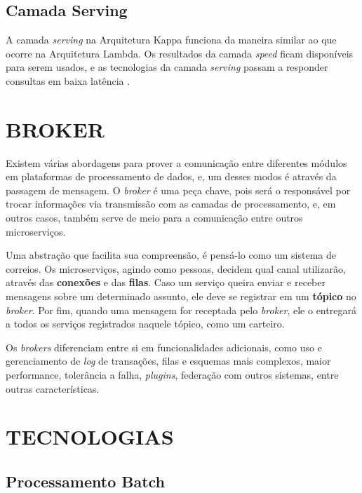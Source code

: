\subsection{Camada Serving}

A camada \textit{serving} na Arquitetura Kappa funciona da maneira similar ao
que ocorre na Arquitetura Lambda. Os resultados da camada \textit{speed}
ficam disponíveis para serem usados, e as tecnologias da camada \textit{serving}
passam a responder consultas em baixa latência \cite{forgeat2015}.

\section{BROKER}

Existem várias abordagens para prover a comunicação entre diferentes módulos em
plataformas de processamento de dados, e, um desses modos é através da passagem
de mensagem. O \textit{broker} é uma peça chave, pois será o responsável por
trocar informações via transmissão com as camadas de processamento, e, em outros
casos, também serve de meio para a comunicação entre outros
microserviços\cite{marz2015}.

Uma abstração que facilita sua compreensão, é pensá-lo como um sistema de
correios. Os microserviços, agindo como pessoas, decidem qual canal
utilizarão, através das \textbf{conexões} e das \textbf{filas}. Caso um serviço
queira enviar e receber mensagens sobre um determinado assunto, ele deve se
registrar em um \textbf{tópico} no \textit{broker}. Por fim, quando uma
mensagem for receptada pelo \textit{broker}, ele o entregará a todos os
serviços registrados naquele tópico, como um carteiro.

Os \textit{brokers} diferenciam entre si em funcionalidades adicionais, como
uso e gerenciamento de \textit{log} de transações, filas e esquemas mais
complexos, maior performance, tolerância a falha, \textit{plugins}, federação
com outros sistemas, entre outras características.

\section{TECNOLOGIAS}

\subsection{Processamento Batch}

